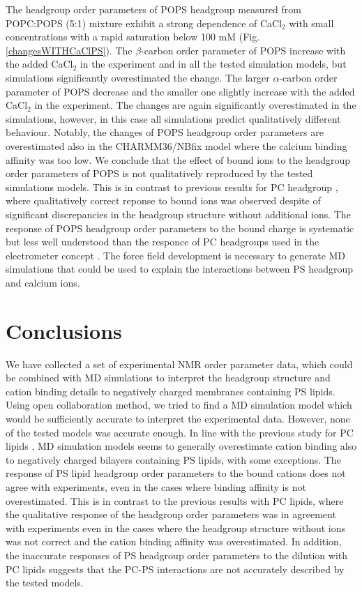 \documentclass[aps,prl,superscriptaddress,twocolumn]{revtex4}
\begin{document}
The headgroup order parameters of POPS headgroup measured from POPC:POPS (5:1) mixture
exhibit a strong dependence of CaCl$_2$ with small concentrations with a rapid saturation
below 100 mM (Fig. \ref{changesWITHCaClPS}). The $\beta$-carbon order parameter of
POPS increase with the added CaCl$_2$ in the experiment and in all the tested simulation models,
but simulations significantly overestimated the change. The larger $\alpha$-carbon order
parameter of POPS decrease and the smaller one slightly increase with the added
CaCl$_2$ in the experiment. The changes are again significantly overestimated in
the simulations, however, in this case all simulations predict qualitatively different
behaviour. Notably, the changes of POPS headgroup order parameters are overestimated
also in the CHARMM36/NBfix model where the calcium binding affinity was too low. 
We conclude that the effect of bound ions to the headgroup order parameters of POPS
is not qualitatively reproduced by the tested simulations models. This is in contrast
to previous results for PC headgroup \cite{catte16}, where qualitatively correct reponse to bound ions was
observed despite of significant discrepancies in the headgroup structure without additional ions. 
The response of POPS headgroup order parameters to the bound charge is systematic but
less well understood than the responce of PC headgroups used in the electrometer
concept \cite{seelig87,roux90}. The force field development is necessary to
generate MD simulations that could be used to explain the interactions between
PS headgroup and calcium ions.


\section{Conclusions}
We have collected a set of experimental NMR order parameter data,
which could be combined with MD simulations to interpret the
headgroup structure and cation binding details to negatively charged
membranes containing PS lipids. Using open collaboration method, we
tried to find a MD simulation model which would be sufficiently accurate
to interpret the experimental data. However, none of the tested models
was accurate enough. In line with the previous study for PC lipids \cite{catte16},
MD simulation models seems to generally overestimate cation binding also
to negatively charged bilayers containing PS lipids, with some exceptions.
The response of PS lipid headgroup order parameters to the bound cations
does not agree with experiments, even in the cases where binding affinity is
not overestimated. This is in contrast to the previous results with PC lipids,
where the qualitative response of the headgroup order parameters was in agreement
with experiments even in the cases where the headgroup structure without ions was not
correct and the cation binding affinity was overestimated. In addition, the inaccurate
responses of PS headgroup order parameters to the dilution with PC lipids suggests
that the PC-PS interactions are not accurately described by the tested models.
\end{document}
